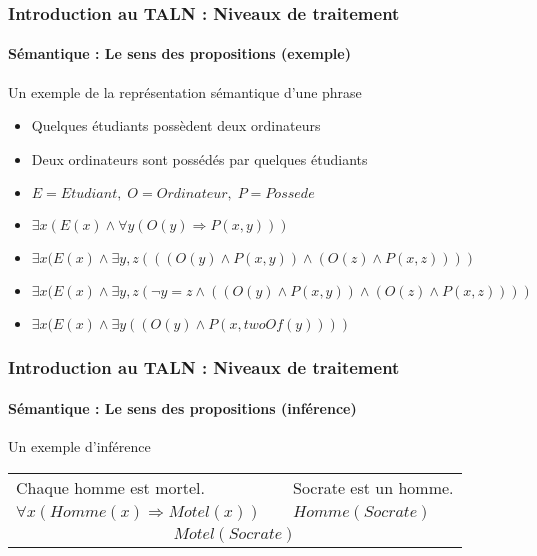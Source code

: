 \documentclass[xcolor=table]{beamer}
\begin{document}
\begin{frame}
\frametitle{Introduction au TALN : Niveaux de traitement}
\framesubtitle{Sémantique : Le sens des propositions (exemple)}

\begin{exampleblock}{Un exemple de la représentation sémantique d'une phrase}
	\begin{itemize}
		\item Quelques étudiants possèdent deux ordinateurs 
		\item Deux ordinateurs sont possédés par quelques étudiants
		\item $E = Etudiant, \; O = Ordinateur, \; P = Possede$
		\item $\exists x (E(x) \wedge \forall y ( O(y) \Rightarrow P(x, y)) )$ \textcolor{red}{\XBox}
		\item $\exists x (E(x) \wedge \exists y, z (( (O(y) \wedge P(x, y) ) \wedge (O(z) \wedge P(x, z) ) ))$ \textcolor{red}{\XBox}
		\item $\exists x (E(x) \wedge \exists y, z (\neg y = z \wedge ( (O(y) \wedge P(x, y) ) \wedge (O(z) \wedge P(x, z) ) ))$ \textcolor{green}{\CheckedBox}
		\item $\exists x (E(x) \wedge \exists y ((O(y) \wedge P(x, twoOf(y)) ))$ \textcolor{green}{\CheckedBox}
	\end{itemize}
\end{exampleblock}

\end{frame}

\begin{frame}
\frametitle{Introduction au TALN : Niveaux de traitement}
\framesubtitle{Sémantique : Le sens des propositions (inférence)}

\begin{exampleblock}{Un exemple d'inférence}
	\centering
	\begin{tabular}{lll}
		Chaque homme est mortel.  & & Socrate est un homme. \\
		$\forall x (Homme(x) \Rightarrow Motel(x))$ && $Homme(Socrate)$ \\
		\hline
		\multicolumn{3}{c}{$Motel(Socrate)$}\\
	\end{tabular}
	
\end{exampleblock}

\end{frame}
\end{document}
